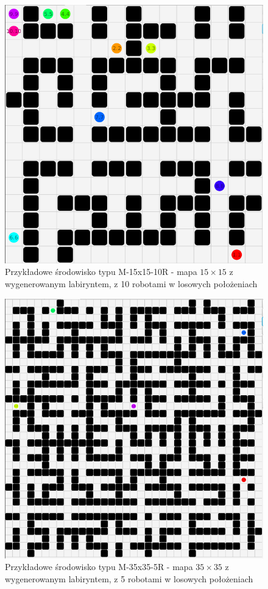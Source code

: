 \begin{figure}
	\centering
	\includegraphics[width=0.6\columnwidth]{img/robopath/tests-15-15-10}
	\caption{Przykładowe środowisko typu M-15x15-10R - mapa $15 \times 15$ z wygenerowanym labiryntem, z 10 robotami w losowych położeniach}
	\label{fig:test-env-15-15-10}
\end{figure}

\begin{figure}
	\centering
	\includegraphics[width=0.6\columnwidth]{img/robopath/tests-35-35-5}
	\caption{Przykładowe środowisko typu M-35x35-5R - mapa $35 \times 35$ z wygenerowanym labiryntem, z 5 robotami w losowych położeniach}
	\label{fig:test-env-35-35-5}
\end{figure}


